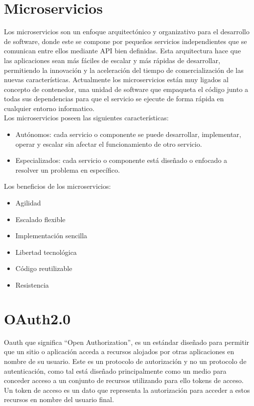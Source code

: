 \documentclass[12pt]{article}
\begin{document}
\section*{Microservicios}

Los microservicios son un enfoque arquitectónico y organizativo para el desarrollo de software, donde este se compone por pequeños servicios independientes que se comunican entre ellos mediante API bien definidas. Esta arquitectura hace que las aplicaciones sean más fáciles de escalar y más rápidas de desarrollar, permitiendo la innovación y la aceleración del tiempo de comercialización de las nuevas características.
Actualmente los microservicios están muy ligados al concepto de contenedor, una unidad de software que empaqueta el código junto a todas sus dependencias para que el servicio se ejecute de forma rápida en cualquier entorno informatico.\\

Los microservicios poseen las siguientes características:
\begin{itemize}
\item Autónomos: cada servicio o componente se puede desarrollar, implementar, operar y escalar sin afectar el funcionamiento de otro servicio.
\item Especializados: cada servicio o componente está diseñado o enfocado a resolver un problema en específico.
\end{itemize}

Los beneficios de los microservicios:
\begin{itemize}
\item Agilidad
\item Escalado flexible
\item Implementación sencilla
\item Libertad tecnológica
\item Código reutilizable
\item Resistencia
\end{itemize}

\section*{OAuth2.0 }

Oauth que significa “Open Authorization”, es un estándar diseñado para permitir que un sitio o aplicación acceda a recursos alojados por otras aplicaciones en nombre de su usuario.
Este es un protocolo de autorización y no un protocolo de autenticación, como tal está diseñado principalmente como un medio para conceder acceso a un conjunto de recursos utilizando para ello tokens de acceso. Un token de acceso es un dato que representa la autorización para acceder a estos recursos en nombre del usuario final.\\
\end{document}
